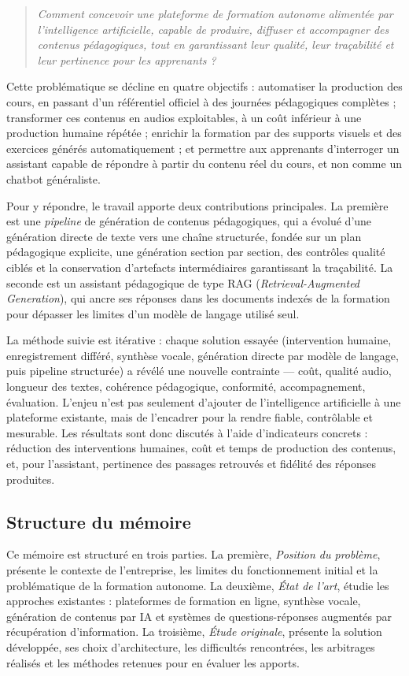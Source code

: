 \begin{quote}
\emph{Comment concevoir une plateforme de formation autonome alimentée par
l'intelligence artificielle, capable de produire, diffuser et accompagner des contenus
pédagogiques, tout en garantissant leur qualité, leur traçabilité et leur pertinence pour
les apprenants ?}
\end{quote}

Cette problématique se décline en quatre objectifs : automatiser la production des cours, en
passant d'un référentiel officiel à des journées pédagogiques complètes ; transformer ces
contenus en audios exploitables, à un coût inférieur à une production humaine répétée ;
enrichir la formation par des supports visuels et des exercices générés automatiquement ;
et permettre aux apprenants d'interroger un assistant capable de répondre à partir du contenu
réel du cours, et non comme un chatbot généraliste.

Pour y répondre, le travail apporte deux contributions principales. La première est une
\emph{pipeline} de génération de contenus pédagogiques, qui a évolué d'une génération
directe de texte vers une chaîne structurée, fondée sur un plan pédagogique explicite, une
génération section par section, des contrôles qualité ciblés et la conservation d'artefacts
intermédiaires garantissant la traçabilité. La seconde est un assistant pédagogique de type
RAG (\emph{Retrieval-Augmented Generation}), qui ancre ses réponses dans les documents
indexés de la formation pour dépasser les limites d'un modèle de langage utilisé seul.

La méthode suivie est itérative : chaque solution essayée (intervention humaine,
enregistrement différé, synthèse vocale, génération directe par modèle de langage, puis
pipeline structurée) a révélé une nouvelle contrainte — coût, qualité audio, longueur des
textes, cohérence pédagogique, conformité, accompagnement, évaluation. L'enjeu n'est pas
seulement d'ajouter de l'intelligence artificielle à une plateforme existante, mais de
l'encadrer pour la rendre fiable, contrôlable et mesurable. Les résultats sont donc discutés à
l'aide d'indicateurs concrets : réduction des interventions humaines, coût et temps de
production des contenus, et, pour l'assistant, pertinence des passages retrouvés et fidélité des
réponses produites.

\subsection*{Structure du mémoire}

Ce mémoire est structuré en trois parties. La première, \emph{Position du problème}, présente
le contexte de l'entreprise, les limites du fonctionnement initial et la problématique de la
formation autonome. La deuxième, \emph{État de l'art}, étudie les approches existantes :
plateformes de formation en ligne, synthèse vocale, génération de contenus par IA et systèmes
de questions-réponses augmentés par récupération d'information. La troisième, \emph{Étude
originale}, présente la solution développée, ses choix d'architecture, les difficultés
rencontrées, les arbitrages réalisés et les méthodes retenues pour en évaluer les apports.
